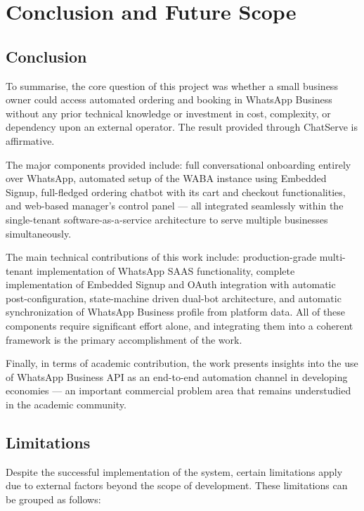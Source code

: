 \chapter{Conclusion and Future Scope}

\section{Conclusion}

To summarise, the core question of this project was whether a small business owner could access automated ordering and booking in WhatsApp Business without any prior technical knowledge or investment in cost, complexity, or dependency upon an external operator. The result provided through ChatServe is affirmative.

The major components provided include: full conversational onboarding entirely over WhatsApp, automated setup of the WABA instance using Embedded Signup, full-fledged ordering chatbot with its cart and checkout functionalities, and web-based manager's control panel --- all integrated seamlessly within the single-tenant software-as-a-service architecture to serve multiple businesses simultaneously.

The main technical contributions of this work include: production-grade multi-tenant implementation of WhatsApp SAAS functionality, complete implementation of Embedded Signup and OAuth integration with automatic post-configuration, state-machine driven dual-bot architecture, and automatic synchronization of WhatsApp Business profile from platform data. All of these components require significant effort alone, and integrating them into a coherent framework is the primary accomplishment of the work.

Finally, in terms of academic contribution, the work presents insights into the use of WhatsApp Business API as an end-to-end automation channel in developing economies --- an important commercial problem area that remains understudied in the academic community.

\section{Limitations}

Despite the successful implementation of the system, certain limitations apply due to external factors beyond the scope of development. These limitations can be grouped as follows:

